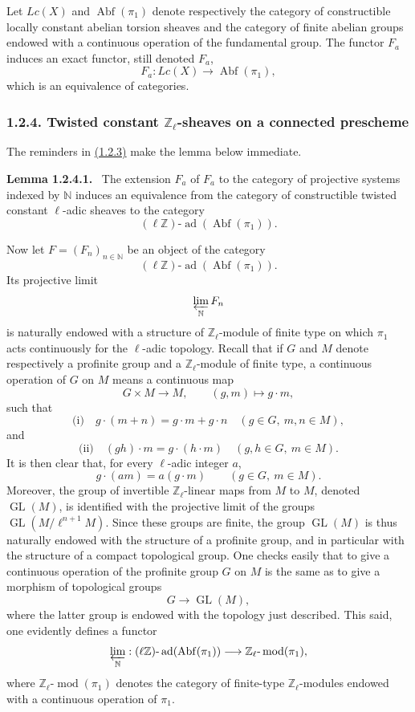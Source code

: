 \documentclass[11pt]{article}
\newenvironment{statement}[1]{\par\medskip\noindent\textbf{#1.}\ }{\par\medskip}
\providecommand{\Abf}{\operatorname{Abf}}
\providecommand{\GL}{\operatorname{GL}}
\providecommand{\ad}{\operatorname{ad}}
\providecommand{\modn}{\operatorname{mod}}
\begin{document}
Let \(Lc(X)\) and \(\Abf(\pi_1)\) denote respectively the category of constructible locally constant abelian torsion sheaves and the category of finite abelian groups endowed with a continuous operation of the fundamental group. The functor \(F_a\) induces an exact functor, still denoted \(F_a\),
\[
F_a:Lc(X)\longrightarrow \Abf(\pi_1),
\]
which is an equivalence of categories.

\subsubsection*{1.2.4. Twisted constant \(\mathbb Z_\ell\)-sheaves on a connected prescheme}\label{sga5:VI:subsubsection:1.2.4}

The reminders in \hyperref[sga5:VI:reminder:1.2.3]{(1.2.3)} make the lemma below immediate.

\label{sga5:VI:lemma:1.2.4.1}\begin{statement}{Lemma 1.2.4.1}
The extension \(\widehat F_a\) of \(F_a\) to the category of projective systems indexed by \(\mathbb N\) induces an equivalence from the category of constructible twisted constant \(\ell\)-adic sheaves to the category
\[
(\ell\mathbb Z)\text{-}\ad(\Abf(\pi_1)).
\]
\end{statement}

Now let \(F=(F_n)_{n\in\mathbb N}\) be an object of the category
\[
(\ell\mathbb Z)\text{-}\ad(\Abf(\pi_1)).
\]
Its projective limit
\[
\varprojlim_{\mathbb N}F_n
\]
is naturally endowed with a structure of \(\mathbb Z_\ell\)-module of finite type on which \(\pi_1\) acts continuously for the \(\ell\)-adic topology. Recall that if \(G\) and \(M\) denote respectively a profinite group and a \(\mathbb Z_\ell\)-module of finite type, a continuous operation of \(G\) on \(M\) means a continuous map
\[
G\times M\longrightarrow M,\qquad (g,m)\longmapsto g\cdot m,
\]
such that
\[
\text{(i)}\quad g\cdot(m+n)=g\cdot m+g\cdot n\quad (g\in G,\ m,n\in M),
\]
and
\[
\text{(ii)}\quad (gh)\cdot m=g\cdot(h\cdot m)\quad (g,h\in G,\ m\in M).
\]
It is then clear that, for every \(\ell\)-adic integer \(a\),
\[
g\cdot(am)=a(g\cdot m)\qquad (g\in G,\ m\in M).
\]
Moreover, the group of invertible \(\mathbb Z_\ell\)-linear maps from \(M\) to \(M\), denoted \(\GL(M)\), is identified with the projective limit of the groups \(\GL(M/\ell^{n+1}M)\). Since these groups are finite, the group \(\GL(M)\) is thus naturally endowed with the structure of a profinite group, and in particular with the structure of a compact topological group. One checks easily that to give a continuous operation of the profinite group \(G\) on \(M\) is the same as to give a morphism of topological groups
\[
G\longrightarrow \GL(M),
\]
where the latter group is endowed with the topology just described. This said, one evidently defines a functor
\[
\varprojlim_{\mathbb N}:(\ell\mathbb Z)\text{-}\ad(\Abf(\pi_1))\longrightarrow
\mathbb Z_\ell\text{-}\modn(\pi_1),
\]
where \(\mathbb Z_\ell\text{-}\modn(\pi_1)\) denotes the category of finite-type \(\mathbb Z_\ell\)-modules endowed with a continuous operation of \(\pi_1\).
\end{document}
